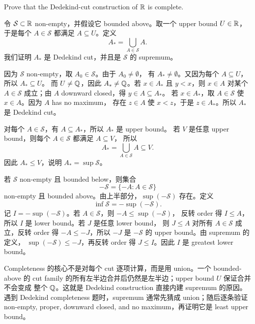 \begin{exerciseblock}
Prove that the Dedekind-cut construction of \(\mathbb{R}\) is complete.
\end{exerciseblock}

\begin{solution}
令 \(\mathcal S\subset\mathbb{R}\) non-empty，并假设它 bounded above。取一个 upper bound
\(U\in\mathbb{R}\)，于是每个 \(A\in\mathcal S\) 都满足 \(A\subseteq U\)。定义
\[
  A_*=\bigcup_{A\in\mathcal S}A.
\]
我们证明 \(A_*\) 是 Dedekind cut，并且是 \(\mathcal S\) 的 supremum。

因为 \(\mathcal S\) non-empty，取 \(A_0\in\mathcal S\)。由于 \(A_0\ne\emptyset\)，
有 \(A_*\ne\emptyset\)。又因为每个 \(A\subseteq U\)，所以 \(A_*\subseteq U\)。
而 \(U\ne\mathbb{Q}\)，因此 \(A_*\ne\mathbb{Q}\)。若 \(x\in A_*\) 且 \(y<x\)，则 \(x\in A\) 对某个
\(A\in\mathcal S\) 成立；由 \(A\) downward closed，得 \(y\in A\subseteq A_*\)。
若 \(x\in A_*\)，取 \(A\in\mathcal S\) 使 \(x\in A\)。因为 \(A\) has no maximum，
存在 \(z\in A\) 使 \(x<z\)，于是 \(z\in A_*\)。所以 \(A_*\) 是 Dedekind cut。

对每个 \(A\in\mathcal S\)，有 \(A\subseteq A_*\)，所以 \(A_*\) 是 upper bound。
若 \(V\) 是任意 upper bound，则每个 \(A\in\mathcal S\) 都满足 \(A\subseteq V\)，
所以
\[
  A_*=\bigcup_{A\in\mathcal S}A\subseteq V.
\]
因此 \(A_*\leq V\)，说明 \(A_*=\sup\mathcal S\)。

若 \(\mathcal S\) non-empty 且 bounded below，则集合
\[
  -\mathcal S=\{-A:A\in\mathcal S\}
\]
non-empty 且 bounded above。由上半部分，\(\sup(-\mathcal S)\) 存在。定义
\[
  \inf\mathcal S=-\sup(-\mathcal S).
\]
记 \(I=-\sup(-\mathcal S)\)。若 \(A\in\mathcal S\)，则 \(-A\leq\sup(-\mathcal S)\)，
反转 order 得 \(I\leq A\)，所以 \(I\) 是 lower bound。若 \(J\) 是任意 lower bound，
则 \(J\leq A\) 对所有 \(A\in\mathcal S\) 成立，反转 order 得
\(-A\leq -J\)，所以 \(-J\) 是 \(-\mathcal S\) 的 upper bound。由 supremum 的定义，
\(\sup(-\mathcal S)\leq -J\)，再反转 order 得 \(J\leq I\)。因此 \(I\) 是 greatest
lower bound。
\end{solution}

\begin{explanation}
Completeness 的核心不是对每个 cut 逐项计算，而是用 union。一个 bounded-above 的
cut family 的所有左半边合并后仍然是左半边；upper bound \(U\) 保证合并不会变成
整个 \(\mathbb{Q}\)。这就是 Dedekind construction 直接内建 supremum 的原因。遇到
Dedekind completeness 题时，supremum 通常先猜成 union；随后逐条验证
non-empty, proper, downward closed, and no maximum，再证明它是 least upper bound。
\end{explanation}

